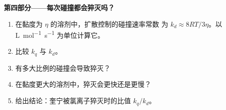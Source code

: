 \begin{problem}
\medskip\noindent\textbf{第四部分——每次碰撞都会猝灭吗？}
\begin{enumerate}[resume]
  \item 在黏度为 $\eta$ 的溶剂中，扩散控制的碰撞速率常数
        为 $k_d \approx 8RT/3\eta$。以 \unit{L.mol^{-1}.s^{-1}} 为单位计算它。
  \item 比较 $k_q$ 与 $k_d$。
  \item 有多大比例的碰撞会导致猝灭？
  \item 在黏度更大的溶剂中，猝灭会更快还是更慢？
  \item 给出结论：奎宁被氯离子猝灭时的比值
        $k_q/k_d$。
\end{enumerate}
\end{problem}
